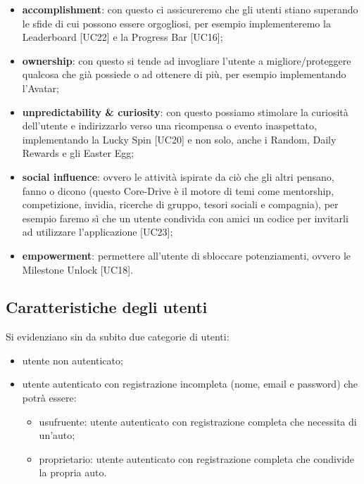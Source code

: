 \begin{itemize}
	\item \textbf{accomplishment}: con questo ci assicureremo che gli utenti stiano superando le sfide di cui possono essere orgogliosi, per esempio implementeremo la Leaderboard [UC22] e la Progress Bar [UC16];
	\item \textbf{ownership}: con questo si tende ad invogliare l'utente a migliore/proteggere qualcosa che già possiede o ad ottenere di più, per esempio implementando l'Avatar;
	\item \textbf{unpredictability \& curiosity}: con questo possiamo stimolare la curiosità dell'utente e indirizzarlo verso una ricompensa o evento inaspettato, implementando la Lucky Spin [UC20] e non solo, anche i Random, Daily Rewards e gli Easter Egg;
	\item \textbf{social influence}: ovvero le attività ispirate da ciò che gli altri pensano, fanno o dicono (questo Core-Drive è il motore di temi come mentorship, competizione, invidia, ricerche di gruppo, tesori sociali e compagnia), per esempio faremo sì che un utente condivida con amici un codice per invitarli ad utilizzare l’applicazione [UC23];
	\item \textbf{empowerment}: permettere all'utente di sbloccare potenziamenti, ovvero le Milestone Unlock [UC18].
\end{itemize}
\subsection{Caratteristiche degli utenti}
Si evidenziano sin da subito due categorie di utenti:
\begin{itemize}
	\item utente non autenticato;
	\item utente autenticato con registrazione incompleta (nome, email e password) che potrà essere:
		\begin{itemize}
			\item usufruente: utente autenticato con registrazione completa che necessita di un'auto;
			\item proprietario: utente autenticato con registrazione completa che condivide la propria auto.
		\end{itemize}
\end{itemize}
